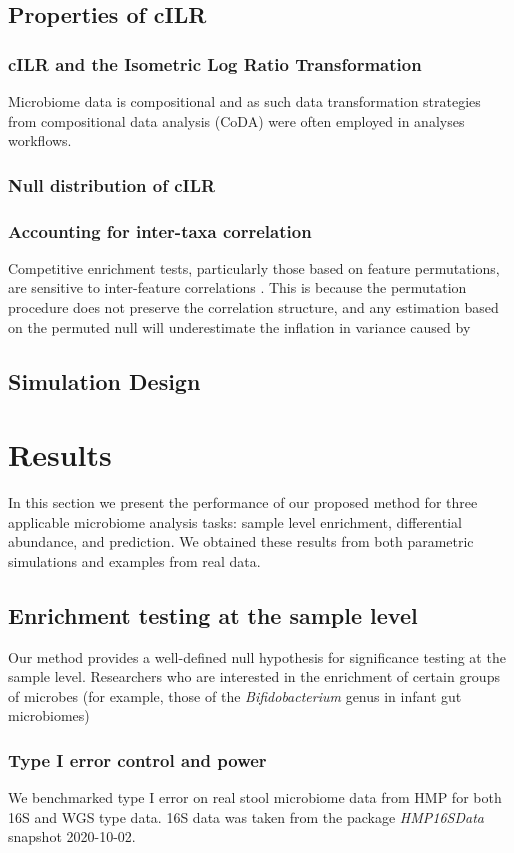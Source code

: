 \documentclass{article}
\begin{document}
\subsection*{Properties of cILR}
\subsubsection*{cILR and the Isometric Log Ratio Transformation}
Microbiome data is compositional \cite{gloor2017} and as such data transformation strategies from compositional data analysis (CoDA) \cite{aitchison} were often employed in analyses workflows. 
\subsubsection*{Null distribution of cILR}
\subsubsection*{Accounting for inter-taxa correlation}
Competitive enrichment tests, particularly those based on feature permutations, are sensitive to inter-feature correlations \cite{wu2012}. This is because the permutation procedure does not preserve the correlation structure, and any estimation based on the permuted null will underestimate the inflation in variance caused by

\subsection*{Simulation Design}

\section*{Results}
In this section we present the performance of our proposed method for three applicable microbiome analysis tasks: sample level enrichment, differential abundance, and prediction. We obtained these results from both parametric simulations and examples from real data.  
\subsection*{Enrichment testing at the sample level}
Our method provides a well-defined null hypothesis for significance testing at the sample level. Researchers who are interested in the enrichment of certain groups of microbes (for example, those of the \emph{Bifidobacterium} genus in infant gut microbiomes)  
\subsubsection*{Type I error control and power}
We benchmarked type I error on real stool microbiome data from HMP for both 16S and WGS type data. 16S data was taken from the package \emph{HMP16SData} snapshot 2020-10-02. 
\end{document}
